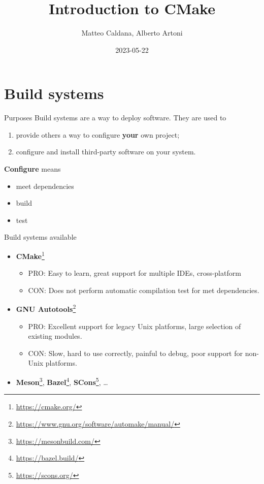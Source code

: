 \documentclass[aspectratio=169,11pt]{beamer}
\title{Introduction to CMake}
\author{Matteo Caldana, Alberto Artoni}
\institute{Politecnico di Milano}
\date{2023-05-22}
\begin{document}
\begin{frame}[plain]{}
    \maketitle
\end{frame}

\section{Build systems}
\begin{frame}{Purposes}
    Build systems are a way to deploy software.
    \vfill
    They are used to
    \begin{enumerate}
        \item provide others a way to configure \textbf{your} own project;
        \item configure and install third-party software on your system.
    \end{enumerate}
    \vfill
    \textbf{Configure} means
    \begin{itemize}
        \item meet dependencies
        \item build
        \item test
    \end{itemize}
\end{frame}

\begin{frame}{Build systems available}
    \begin{itemize}
    \item \textbf{CMake}\footnote{\url{https://cmake.org/}}
    \begin{itemize}
    \item PRO: Easy to learn, great support for multiple IDEs, cross-platform
    \item CON: Does not perform automatic compilation test for met dependencies.
    \end{itemize}
    \item \textbf{GNU Autotools}\footnote{\url{https://www.gnu.org/software/automake/manual/}}
    \begin{itemize}
    \item PRO: Excellent support for legacy Unix platforms, large selection of existing modules.
    \item CON: Slow, hard to use correctly, painful to debug, poor support for non-Unix platforms.
    \end{itemize}
    \item \textbf{Meson}\footnote{\url{https://mesonbuild.com/}}, \textbf{Bazel}\footnote{\url{https://bazel.build/}}, \textbf{SCons}\footnote{\url{https://scons.org/}}, \dots
    \end{itemize}
\end{frame}
\end{document}
